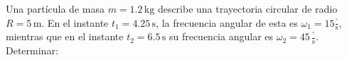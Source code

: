 \documentclass[addpoints]{exam}
\newcommand{\grado}[0]{^{\circ}}
\begin{document}
\begin{questions}




    \question Una partícula de masa $m = 1.2 \, \text{kg}$ describe una trayectoria circular de radio $R = 5 \, \text{m}$. En el instante $t_1 = 4.25 \, \text{s}$, la frecuencia angular de esta es $\omega_1 = 15 \frac{{}\grado}{\text{s}}$, mientras que en el instante $t_2 = 6.5 \, \text{s}$ su frecuencia angular es $\omega_2 = 45 \, \frac{{}\grado}{\text{s}}$. Determinar:
\end{questions}
\end{document}
